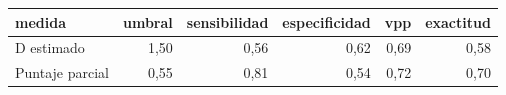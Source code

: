 \begin{tabular}{lrrrrr}
\toprule
medida & umbral & sensibilidad & especificidad & vpp & exactitud \\
\midrule
D estimado & 1{,}50 & 0{,}56 & 0{,}62 & 0{,}69 & 0{,}58 \\
Puntaje parcial & 0{,}55 & 0{,}81 & 0{,}54 & 0{,}72 & 0{,}70 \\
\bottomrule
\end{tabular}

